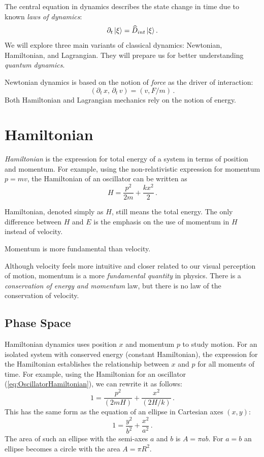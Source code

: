 The central equation in dynamics describes the state change in time due to known \emph{laws of dynamics}:
\[
\partial_t\,|{\xi}\rangle=\widehat{D}_{int}\,|{\xi}\rangle\,.
\]
We will explore three main variants of classical dynamics: Newtonian, Hamiltonian, and Lagrangian. They will prepare us for better understanding \emph{quantum dynamics}.

Newtonian dynamics is based on the notion of \emph{force} as the driver of interaction:
\[
(\partial_t\,x,\,\partial_t\, v)=(v, F/m)\,.
\]
Both Hamiltonian and Lagrangian mechanics rely on the notion of energy. 

\section{Hamiltonian}\label{sec:Hamiltonian}
\emph{Hamiltonian} is the expression for total energy of a system in terms of position and momentum. For example, using the non-relativistic expression for momentum $p=mv$, the Hamiltonian of  an oscillator can be written as
\begin{equation}
	H = \frac{p^2}{2m} + \frac{kx^2}{2}\,.
	\label{eq:OscillatorHamiltonian}
\end{equation}

Hamiltonian, denoted simply as $H$, still means the total energy. The only difference between $H$ and $E$  is the emphasis on the use of momentum in $H$ instead of velocity.

\begin{important}
	Momentum is more fundamental than velocity.
\end{important}

Although velocity feels more intuitive and closer related to our visual perception of motion, momentum is a more \emph{fundamental quantity} in physics. There is a \emph{conservation of energy and momentum} law, but there is no law of the conservation of velocity.

\subsection{Phase Space}
Hamiltonian dynamics uses position $x$  and momentum $p$  to study motion. For an isolated system with conserved energy (constant Hamiltonian), the expression for the Hamiltonian establishes the relationship between $x$ and $p$  for all moments of time. For example, using the Hamiltonian for an oscillator (\ref{eq:OscillatorHamiltonian}), we can rewrite it as follows:
\begin{equation}
	1=\frac{p^2}{(2mH)}+\frac{x^2}{(2H/k)}\,.
	\label{eq:phaseSpaceEllipse}
\end{equation}
This has the same form as the equation of an ellipse in Cartesian axes $(x,y)$:
\[
1=\frac{y^2}{b^2}+\frac{x^2}{a^2}\,.
\]
The area of such an ellipse with the semi-axes $a$ and $b$ is $A=\pi ab$. For $a=b$ an ellipse becomes a circle with the area $A=\pi R^2$.

